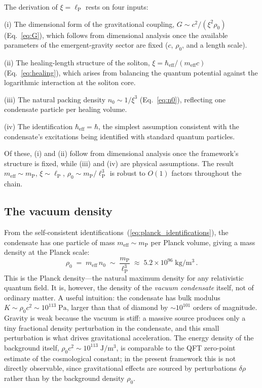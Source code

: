 \documentclass[12pt, a4paper]{article}
\newcommand{\meff}{m_{\mathrm{eff}}}
\newcommand{\heff}{\hbar_{\mathrm{eff}}}
\newcommand{\lP}{\ell_{\mathrm{P}}}
\newcommand{\mP}{m_{\mathrm{P}}}
\begin{document}
The derivation of $\xi = \lP$ rests on four inputs:

(i) The dimensional form of the gravitational
coupling, $G \sim c^2/(\xi^2\rho_0)$
(Eq.~\ref{eq:G}), which follows from dimensional
analysis once the available parameters of the
emergent-gravity sector are fixed
($c$, $\rho_0$, and a length scale).

(ii) The healing-length structure of the soliton,
$\xi = \heff/(\meff c)$ (Eq.~\ref{eq:healing}),
which arises from balancing the quantum potential
against the logarithmic interaction at the soliton
core.

(iii) The natural packing density $n_0 \sim 1/\xi^3$
(Eq.~\ref{eq:n0}), reflecting one condensate
particle per healing volume.

(iv) The identification $\heff = \hbar$, the
simplest assumption consistent with the condensate's
excitations being identified with standard quantum
particles.

Of these, (i) and (ii) follow from dimensional
analysis once the framework's structure is fixed,
while (iii) and (iv) are physical assumptions. The
result $\meff \sim \mP$, $\xi \sim \lP$,
$\rho_0 \sim \mP/\lP^3$ is robust to $O(1)$ factors
throughout the chain.

\subsection{The vacuum density}

From the self-consistent
identifications~(\ref{eq:planck_identifications}),
the condensate has one particle of mass $\meff \sim \mP$ per Planck volume, giving a mass density at the
Planck scale:
\begin{equation}
    \rho_0 \;=\; \meff\,n_0 \;\sim\; \frac{\mP}{\lP^3}
    \;\approx\; 5.2 \times 10^{96}\;\mathrm{kg/m^3}\,.
\label{eq:rho0}
\end{equation}
This is the Planck density---the natural maximum
density for any relativistic quantum field. It is,
however, the density of the \emph{vacuum condensate}
itself, not of ordinary matter. A useful intuition:
the condensate has bulk modulus $K \sim \rho_0 c^2
\sim 10^{113}\;\mathrm{Pa}$, larger than that of
diamond by $\sim 10^{101}$ orders of magnitude.
Gravity is weak because the vacuum is stiff: a
massive source produces only a tiny fractional
density perturbation in the condensate, and this
small perturbation is what drives gravitational
acceleration. The energy density of the background
itself, $\rho_0 c^2 \sim 10^{113}\;\mathrm{J/m^3}$,
is comparable to the QFT zero-point estimate of
the cosmological constant; in the present framework
this is not directly observable, since gravitational
effects are sourced by perturbations
$\delta\rho$ rather than by the background density
$\rho_0$.
\end{document}
